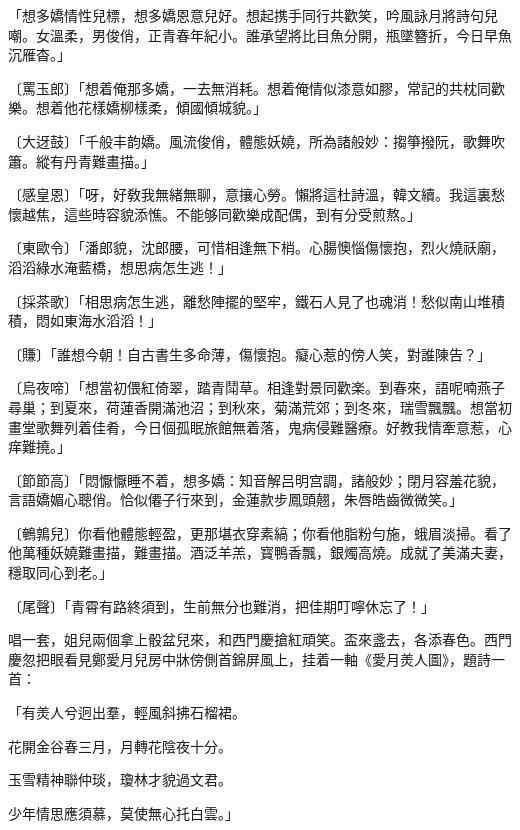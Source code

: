 \begin{myquote}
「想多嬌情性兒標，想多嬌恩意兒好。想起携手同行共歡笑，吟風詠月將詩句兒嘲。女溫柔，男俊俏，正青春年紀小。誰承望將比目魚分開，瓶墜簪折，今日早魚沉雁杳。」

{\markfont〔罵玉郎〕}「想着俺那多嬌，一去無消耗。想着俺情似漆意如膠，常記的共枕同歡樂。想着他花樣嬌柳樣柔，傾國傾城貌。」

{\markfont〔大迓鼓〕}「千般丰韵嬌。風流俊俏，體態妖嬈，所為諸般妙：搊箏撥阮，歌舞吹簫。縱有丹青難畫描。」

{\markfont〔感皇恩〕}「呀，好敎我無緒無聊，意攘心勞。懶將這杜詩溫，韓文續。我這裏愁懷越焦，這些時容貌添憔。不能够同歡樂成配偶，到有分受煎熬。」

{\markfont〔東歐令〕}「潘郎貌，沈郎腰，可惜相逢無下梢。心腸懊惱傷懷抱，烈火燒祅廟，滔滔綠水淹藍橋，想思病怎生逃！」

{\markfont〔採茶歌〕}「相思病怎生逃，離愁陣擺的堅牢，鐵石人見了也魂消！愁似南山堆積積，悶如東海水滔滔！」

{\markfont〔賺〕}「誰想今朝！自古書生多命薄，傷懷抱。癡心惹的傍人笑，對誰陳告？」

{\markfont〔烏夜啼〕}「想當初偎紅倚翠，踏青鬦草。相逢對景同歡楽。到春來，語呢喃燕子尋巢；到夏來，荷蓮香開滿池沼；到秋來，菊滿荒郊；到冬來，瑞雪飄飄。想當初畫堂歌舞列着佳肴，今日個孤眠旅館無着落，鬼病侵難醫療。好教我情牽意惹，心痒難撓。」

{\markfont〔節節高〕}「悶懨懨睡不着，想多嬌：知音解吕明宫調，諸般妙；閉月容羞花貌，言語嬌媚心聰俏。恰似僊子行來到，金蓮款步鳳頭翹，朱唇皓齒微微笑。」

{\markfont〔鵪鶉兒〕}你看他體態輕盈，更那堪衣穿素縞；你看他脂粉勻施，蛾眉淡掃。看了他萬種妖嬈難畫描，難畫描。酒泛羊羔，寳鴨香飄，銀燭高燒。成就了美滿夫妻，穩取同心到老。」

{\markfont〔尾聲〕}「青霄有路終須到，生前無分也難消，把佳期叮嚀休忘了！」
\end{myquote}

唱一套，姐兒兩個拿上骰盆兒來，和西門慶搶紅頑笑。盃來盞去，各添春色。西門慶忽把眼看見鄭愛月兒房中牀傍側首錦屏風上，挂着一軸《愛月羙人圖》，題詩一首：

\begin{myquote}
「有羙人兮迥出羣，輕風斜拂石榴裙。

花開金谷春三月，月轉花陰夜十分。

玉雪精神聯仲琰，瓊林才貌過文君。

少年情思應須慕，莫使無心托白雲。」

\end{myquote}

